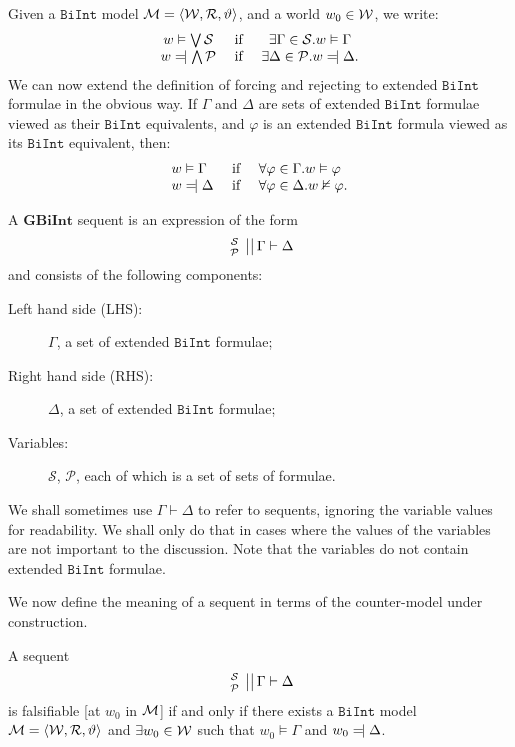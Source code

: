 \documentclass{llncs}
\numberwithin{equation}{section}
\newcommand{\Pred}{{\mathcal{P}}}
\newcommand{\Succ}{{\mathcal{S}}}
\newcommand{\Lg}[1]{\mathtt{#1}}
\newcommand{\sequent}{\vdash}
\newcommand{\Force}{\vDash}
\newcommand{\NotForce}{\nvDash}
\def\Reject{=\joinrel\mathrel|}
\newcommand{\stacked}[2]{
\genfrac{}{}{0pt}{}{#1}{#2} 
 }
\newcommand{\mycal}[1]{
        {\cal{#1}}
}
\newcommand{\Sequent}[4]{
        \left. \left. \begin{array}{l} \hspace{-5pt} \stacked{#1}{#2}  \hspace{-5pt}\end{array} \ \right|\right| #3 \sequent #4
}
\newcommand{\SequentAny}{
        \Sequent{\Succ}{\Pred}{\Gamma}{\Delta}
}
\newcommand{\Model}{
        \mycal{M}=\langle \mycal{W}, \mycal{R}, \vartheta \rangle
}
\newcommand {\BiInt}{
        \Lg{BiInt}
}
\newcommand{\GBiInt}{\mathbf{GBiInt}}
\begin{document}
\begin{definition}\label{extendedSemantics}
Given a $\BiInt$ model $\Model$, and a world $w_0 \in \mycal{W}$, we write:
$$
\begin{array}{ccc}
	w \Force \bigvee \Succ			&		\text{ if }	&		\exists \Gamma \in \Succ . w \Force \Gamma \\
	w \Reject \bigwedge \Pred	&		\text{ if }	&		\exists \Delta \in \Pred . w \Reject \Delta.
\end{array}
$$
We can now extend the definition of forcing and rejecting to extended $\BiInt$ formulae in the obvious way. If $\Gamma$ and $\Delta$ are sets of extended $\BiInt$ formulae viewed as their $\BiInt$ equivalents, and $\varphi$ is an extended $\BiInt$ formula viewed as its $\BiInt$ equivalent, then:
$$
\begin{array}{lll}
	w \Force \Gamma			&		\text{ if }	&		\forall \varphi \in \Gamma . w \Force \varphi \\
	w \Reject \Delta	&		\text{ if }	&		\forall \varphi \in \Delta . w \NotForce \varphi. \\
\end{array}
$$
\end{definition}

\begin{definition}[Sequent]
A $\GBiInt$ sequent is an expression of the form $$ \SequentAny $$ and consists of the following components:
	\begin{description}
		\item[Left hand side (LHS):] $\Gamma$, a set of extended $\BiInt$ formulae;
		\item[Right hand side (RHS):] $\Delta$, a set of extended $\BiInt$ formulae;
		\item[Variables:] $\Succ$, $\Pred$, each of which is a set of sets of formulae.
	\end{description}
\end{definition}

\noindent We shall sometimes use $\Gamma \sequent \Delta$ to refer to sequents, ignoring the variable values for readability. We shall only do that in cases where the values of the variables are not important to the discussion. Note that the variables do not contain extended $\BiInt$ formulae.

We now define the meaning of a sequent in terms of the counter-model under construction.

\begin{definition}[Falsifiability]\label{falsifiability}
A sequent $$ \SequentAny $$ is falsifiable [at $w_0$ in $\mycal{M}$] if and only if there exists a $\BiInt$ model $\Model$ and $\exists w_0 \in \mycal{W}$ such that $w_0 \Force \Gamma$ and $w_0 \Reject \Delta$.
\end{definition}
\end{document}
